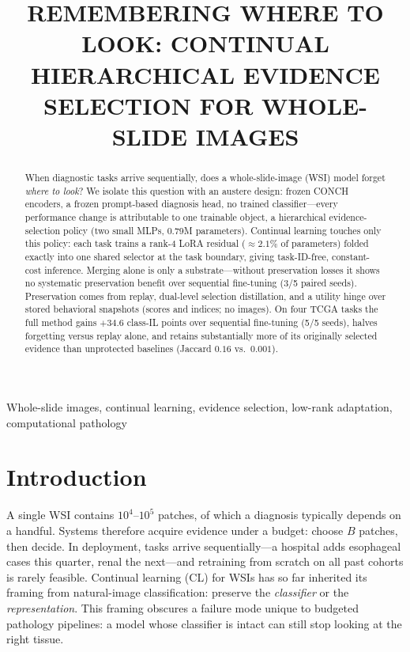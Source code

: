 \documentclass{article}
\title{REMEMBERING WHERE TO LOOK: CONTINUAL HIERARCHICAL EVIDENCE SELECTION FOR WHOLE-SLIDE IMAGES}
\begin{document}
\ninept %
%
\maketitle
%
\begin{abstract}
When diagnostic tasks arrive sequentially, does a whole-slide-image (WSI) model forget \emph{where to look}? We isolate this question with an austere design: frozen CONCH encoders, a frozen prompt-based diagnosis head, no trained classifier---every performance change is attributable to one trainable object, a hierarchical evidence-selection policy (two small MLPs, 0.79M parameters). Continual learning touches only this policy: each task trains a rank-4 LoRA residual (${\approx}2.1\%$ of parameters) folded exactly into one shared selector at the task boundary, giving task-ID-free, constant-cost inference. Merging alone is only a substrate---without preservation losses it shows no systematic preservation benefit over sequential fine-tuning (3/5 paired seeds). Preservation comes from replay, dual-level selection distillation, and a utility hinge over stored behavioral snapshots (scores and indices; no images). On four TCGA tasks the full method gains $+34.6$ class-IL points over sequential fine-tuning (5/5 seeds), halves forgetting versus replay alone, and retains substantially more of its originally selected evidence than unprotected baselines (Jaccard $0.16$ vs.\ $0.001$).
\end{abstract}
%
\begin{keywords}
Whole-slide images, continual learning, evidence selection, low-rank adaptation, computational pathology
\end{keywords}
%
\section{Introduction}
\label{sec:intro}
A single WSI contains $10^4$--$10^5$ patches, of which a diagnosis typically depends on a handful. Systems therefore acquire evidence under a budget: choose $B$ patches, then decide. In deployment, tasks arrive sequentially---a hospital adds esophageal cases this quarter, renal the next---and retraining from scratch on all past cohorts is rarely feasible. Continual learning (CL) for WSIs has so far inherited its framing from natural-image classification: preserve the \emph{classifier} or the \emph{representation}. This framing obscures a failure mode unique to budgeted pathology pipelines: a model whose classifier is intact can still stop looking at the right tissue.
\end{document}
